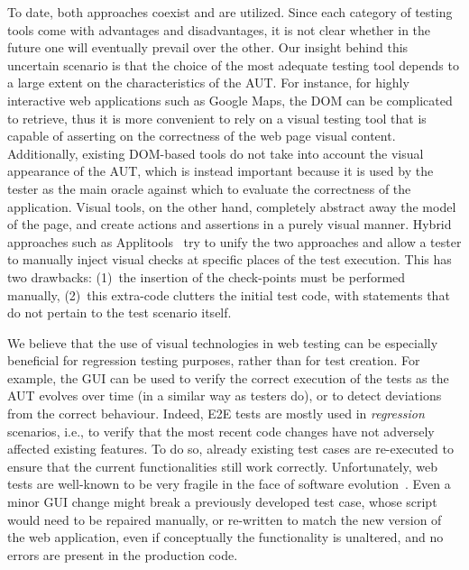 To date, both approaches coexist and are utilized. Since each category of testing tools come with advantages and disadvantages, it is not clear whether in the future one will eventually prevail over the other. Our insight behind this uncertain scenario is that the choice of the most adequate testing tool depends to a large extent on the characteristics of the AUT. For instance, for highly interactive web applications such as Google Maps, the DOM can be complicated to retrieve, thus it is more convenient to rely on a visual testing tool that is capable of asserting on the correctness of the web page visual content.
Additionally, existing DOM-based tools do not take into account the visual appearance of the AUT, which is instead important because it is used by the tester as the main oracle against which to evaluate the correctness of the application. Visual tools, on the other hand, completely abstract away the model of the page, and create actions and assertions in a purely visual manner. 
%
Hybrid approaches such as Applitools~\cite{applitools} try to unify the two approaches and allow a tester to manually inject visual checks at specific places of the test execution. This has two drawbacks: (1)~the insertion of the check-points must be performed manually, (2)~this extra-code clutters the initial test code, with statements that do not pertain to the test scenario itself.

We believe that the use of visual technologies in web testing can  be especially beneficial for regression testing purposes, rather than for test creation. For example, the GUI can be used to verify the correct execution of the tests as the AUT evolves over time (in a similar way as testers do), or to detect deviations from the correct behaviour.
Indeed, E2E tests are mostly used in \textit{regression} scenarios, i.e., to verify that the most recent code changes have not adversely affected existing features. To do so, already existing test cases are re-executed to ensure that the current functionalities still work correctly. 
%
Unfortunately, web tests are well-known to be very fragile in the face of software evolution~\cite{2016-leotta-Advances,2016-Leotta-JSEP,Hammoudi-2016-ICST}. %
Even a minor GUI change might break a previously developed test case, whose script would need to be repaired manually, or re-written to match the new version of the web application, even if conceptually the functionality is unaltered, and no errors are present in the production code.

